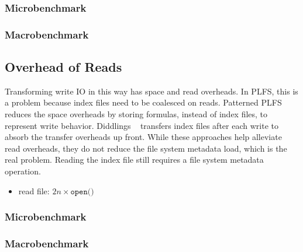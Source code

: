 \subsubsection{Microbenchmark}
\subsubsection{Macrobenchmark}

\subsection{Overhead of Reads}

Transforming write IO in this way has space and read overheads. In PLFS, this
is a problem because index files need to be coalesced on reads.  Patterned
PLFS~\cite{he:hpdc13-plfs-patterns} reduces the space overheads by storing
formulas, instead of index files, to represent write behavior. Diddlings
~\cite{grider:pc17-diddlings} transfers index files after each write to absorb
the transfer overheads up front. While these approaches help alleviate read
overheads, they do not reduce the file system metadata load, which is the real
problem. Reading the index file still requires a file system metadata
operation.

\begin{itemize}
  \item read file: \(2n \times \texttt{open()}\) 
\end{itemize}

\subsubsection{Microbenchmark}
\subsubsection{Macrobenchmark}
